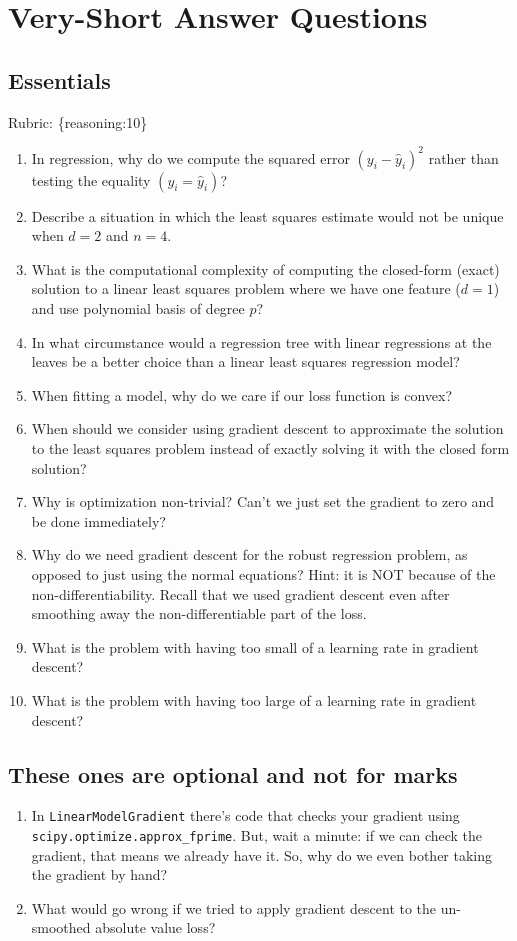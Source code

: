 \documentclass{article}
\def\rubric#1{\gre{Rubric: \{#1\}}}{}
\def\gre#1{{\color{gre}#1}}
\def\enum#1{\begin{enumerate}#1\end{enumerate}}
\begin{document}
\section{Very-Short Answer Questions}

\subsection{Essentials}
\rubric{reasoning:10}

\enum{
\item In regression, why do we compute the squared error $(y_i - \hat{y}_i)^2$ rather than testing the equality $(y_i = \hat{y}_i)$?
\item Describe a situation in which the least squares estimate would not be unique when $d=2$ and $n=4$. 
\item What is the computational complexity of computing the closed-form (exact) solution to a linear least squares problem where we have one feature ($d = 1$) and use polynomial basis of degree $p$?
\item In what circumstance would a regression tree with linear regressions at the leaves be a better choice
than a linear least squares regression model?
\item When fitting a model, why do we care if our loss function is convex?
\item When should we consider using gradient descent to approximate the solution to the least squares problem instead of exactly solving it with the closed form solution?
\item Why is optimization non-trivial? Can't we just set the gradient to zero and be done immediately?
\item Why do we need gradient descent for the robust regression problem, as opposed to just using the normal equations? Hint: it is NOT because of the non-differentiability. Recall that we used gradient descent even after smoothing away the non-differentiable part of the loss.
\item What is the problem with having too small of a learning rate in gradient descent?
\item What is the problem with having too large of a learning rate in gradient descent?
}

\subsection{These ones are optional and not for marks}

\enum{
\item In \texttt{LinearModelGradient} there's code that checks your gradient using \texttt{scipy.optimize.approx\_fprime}. But, wait a minute: if we can check the gradient, that means we already have it. So, why do we even bother taking the gradient by hand? 
\item What would go wrong if we tried to apply gradient descent to the un-smoothed absolute value loss?
}
\end{document}

